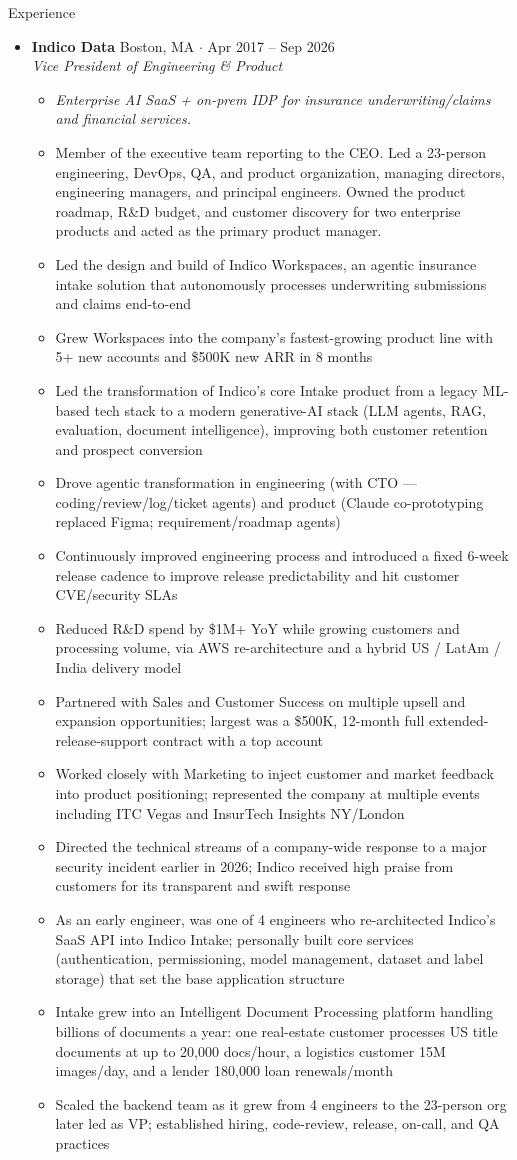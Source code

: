 \documentclass[10pt,oneside]{article}
\newenvironment{ressection}[1]{
  \vspace{4pt}
  {\fontfamily{phv}\selectfont\Large#1}
  \begin{itemize}
    \vspace{3pt}
}{
  \end{itemize}
}
\newcommand{\ressubitem}[1]{
  \vspace{-1pt}
\item \begin{flushleft} #1 \end{flushleft}
}
\newcommand{\rescontext}[1]{
  \vspace{-3pt}
\item[] \begin{flushleft} \textit{\small #1} \end{flushleft}
}
\newcommand{\resscope}[1]{
  \vspace{-3pt}
\item[] \begin{flushleft} #1 \end{flushleft}
}
\newcommand{\resbigitem}[3]{
  \vspace{-5pt}
\item
  \textbf{#1} \hfill #2 \\
  \textit{#3}
}
\newenvironment{ressubsec}[3]{
  \resbigitem{#1}{#2}{#3}
  \vspace{-2pt}
  \begin{itemize}
}{
  \end{itemize}
}
\begin{document}
\begin{ressection}{Experience}

  \begin{ressubsec}{Indico Data}{Boston, MA \; $\cdot$ \; Apr 2017 -- Sep 2026}{Vice President of Engineering \& Product}
    \rescontext{Enterprise AI SaaS + on-prem IDP for insurance underwriting/claims and financial services.}
    \resscope{Member of the executive team reporting to the CEO. Led a 23-person engineering, DevOps, QA, and product organization, managing directors, engineering managers, and principal engineers. Owned the product roadmap, R\&D budget, and customer discovery for two enterprise products and acted as the primary product manager.}
    \ressubitem{Led the design and build of Indico Workspaces, an agentic insurance intake solution that autonomously processes underwriting submissions and claims end-to-end}
    \ressubitem{Grew Workspaces into the company's fastest-growing product line with 5+ new accounts and \$500K new ARR in 8 months}
    \ressubitem{Led the transformation of Indico's core Intake product from a legacy ML-based tech stack to a modern generative-AI stack (LLM agents, RAG, evaluation, document intelligence), improving both customer retention and prospect conversion}
    \ressubitem{Drove agentic transformation in engineering (with CTO --- coding/review/log/ticket agents) and product (Claude co-prototyping replaced Figma; requirement/roadmap agents)}
    \ressubitem{Continuously improved engineering process and introduced a fixed 6-week release cadence to improve release predictability and hit customer CVE/security SLAs}
    \ressubitem{Reduced R\&D spend by \$1M+ YoY while growing customers and processing volume, via AWS re-architecture and a hybrid US / LatAm / India delivery model}
    \ressubitem{Partnered with Sales and Customer Success on multiple upsell and expansion opportunities; largest was a \$500K, 12-month full extended-release-support contract with a top account}
    \ressubitem{Worked closely with Marketing to inject customer and market feedback into product positioning; represented the company at multiple events including ITC Vegas and InsurTech Insights NY/London}
    \ressubitem{Directed the technical streams of a company-wide response to a major security incident earlier in 2026; Indico received high praise from customers for its transparent and swift response}
    \ressubitem{As an early engineer, was one of 4 engineers who re-architected Indico's SaaS API into Indico Intake; personally built core services (authentication, permissioning, model management, dataset and label storage) that set the base application structure}
    \ressubitem{Intake grew into an Intelligent Document Processing platform handling billions of documents a year: one real-estate customer processes US title documents at up to 20{,}000 docs/hour, a logistics customer 15M images/day, and a lender 180{,}000 loan renewals/month}
    \ressubitem{Scaled the backend team as it grew from 4 engineers to the 23-person org later led as VP; established hiring, code-review, release, on-call, and QA practices}
  \end{ressubsec}


\end{ressection}
\end{document}
